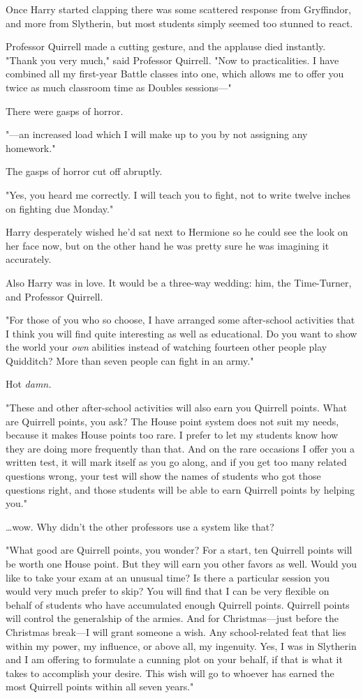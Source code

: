 Once Harry started clapping there was some scattered response from Gryffindor, 
and more from Slytherin, but most students simply seemed too stunned to react.

Professor Quirrell made a cutting gesture, and the applause died instantly. 
"Thank you very much," said Professor Quirrell. "Now to practicalities. I have 
combined all my first-year Battle classes into one, which allows me to offer 
you twice as much classroom time as Doubles sessions---"

There were gasps of horror.

"---an increased load which I will make up to you by not assigning any 
homework."

The gasps of horror cut off abruptly.

"Yes, you heard me correctly. I will teach you to fight, not to write twelve 
inches on fighting due Monday."

Harry desperately wished he'd sat next to Hermione so he could see the look on 
her face now, but on the other hand he was pretty sure he was imagining it 
accurately.

Also Harry was in love. It would be a three-way wedding: him, the Time-Turner, 
and Professor Quirrell.

"For those of you who so choose, I have arranged some after-school activities 
that I think you will find quite interesting as well as educational. Do you 
want to show the world your \emph{own} abilities instead of watching fourteen 
other people play Quidditch? More than seven people can fight in an army."

Hot \emph{damn.}

"These and other after-school activities will also earn you Quirrell points. 
What are Quirrell points, you ask? The House point system does not suit my 
needs, because it makes House points too rare. I prefer to let my students know 
how they are doing more frequently than that. And on the rare occasions I offer 
you a written test, it will mark itself as you go along, and if you get too 
many related questions wrong, your test will show the names of students who got 
those questions right, and those students will be able to earn Quirrell points 
by helping you."

{\ldots}wow. Why didn't the other professors use a system like that?

"What good are Quirrell points, you wonder? For a start, ten Quirrell points 
will be worth one House point. But they will earn you other favors as well. 
Would you like to take your exam at an unusual time? Is there a particular 
session you would very much prefer to skip? You will find that I can be very 
flexible on behalf of students who have accumulated enough Quirrell points. 
Quirrell points will control the generalship of the armies. And for 
Christmas---just before the Christmas break---I will grant someone a wish. Any 
school-related feat that lies within my power, my influence, or above all, my 
ingenuity. Yes, I was in Slytherin and I am offering to formulate a cunning 
plot on your behalf, if that is what it takes to accomplish your desire. This 
wish will go to whoever has earned the most Quirrell points within all seven 
years."

